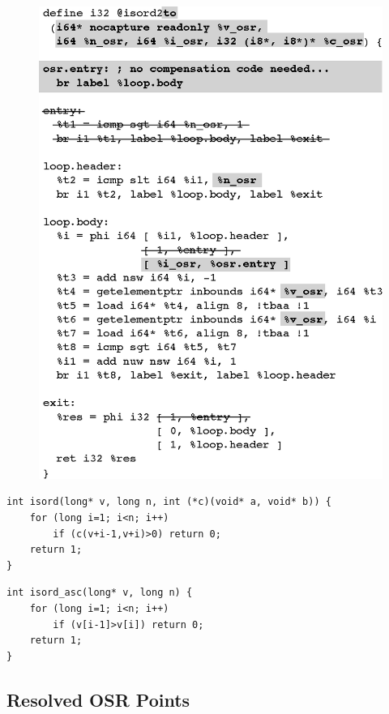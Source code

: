 \ifdefined\noauthorea
\begin{figure}[t]
\begin{center}
\includegraphics[width=0.9\columnwidth]{figures/isord2to/isord2to.eps}
\caption{\protect}
\end{center}
\end{figure}
\fi

\begin{verbatim}
int isord(long* v, long n, int (*c)(void* a, void* b)) {
    for (long i=1; i<n; i++) 
        if (c(v+i-1,v+i)>0) return 0;
    return 1;
}
\end{verbatim}

\begin{verbatim}
int isord_asc(long* v, long n) {
    for (long i=1; i<n; i++) 
        if (v[i-1]>v[i]) return 0;
    return 1;
}
\end{verbatim}

\subsection{Resolved OSR Points}

